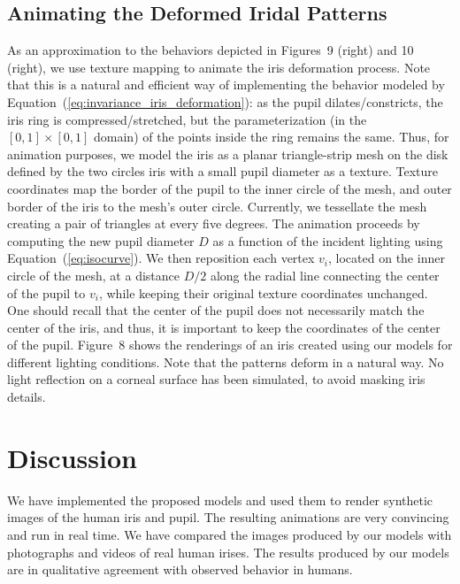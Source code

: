 \documentclass{acmtog} %
\begin{document}
%
\subsection{Animating the Deformed Iridal Patterns}
\label{sec:iris_animation}
%
As an approximation to the behaviors depicted in Figures~9 (right) and
10 (right), we use texture mapping to animate the iris deformation
process. Note that this is a natural and efficient way of implementing
the behavior modeled by Equation~(\ref{eq:invariance_iris_deformation}):
as the pupil dilates/constricts, the iris ring is compressed/stretched,
but the parameterization (in the $[0,1] \times [0,1]$ domain) of the
points inside the ring remains the same. Thus, for animation purposes,
we model the iris as a planar triangle-strip mesh on the disk defined by
the two circles %
iris with a small pupil diameter as a texture. Texture coordinates map
the border of the pupil to the inner circle of the mesh, and outer
border of the iris to the mesh's outer circle. Currently, we tessellate
the mesh creating a pair of triangles at every five degrees. The
animation proceeds by computing the new pupil diameter $D$ as a function
of the incident lighting using Equation~(\ref{eq:isocurve}). We then
reposition each vertex $v_i$, located on the inner circle of the mesh,
at a distance $D/2$ along the radial line connecting the center of the
pupil to $v_i$, while keeping their original texture coordinates
unchanged. One should recall that the center of the pupil does not
necessarily match the center of the iris, and thus, it is important to
keep the coordinates of the center of the pupil. Figure~8 shows the
renderings of an iris created using our models for different lighting
conditions. Note that the patterns deform in a natural way. No light
reflection on a corneal surface has been simulated, to avoid masking
iris details.


\section{Discussion}
\label{sec:results}

We have implemented the proposed models and used them to render
synthetic images of the human iris and pupil. The resulting animations
are very convincing and run in real time. We have compared the images
produced by our models with photographs and videos of real human irises.
The results produced by our models are in qualitative agreement with
observed behavior in humans.
 
\end{document}
